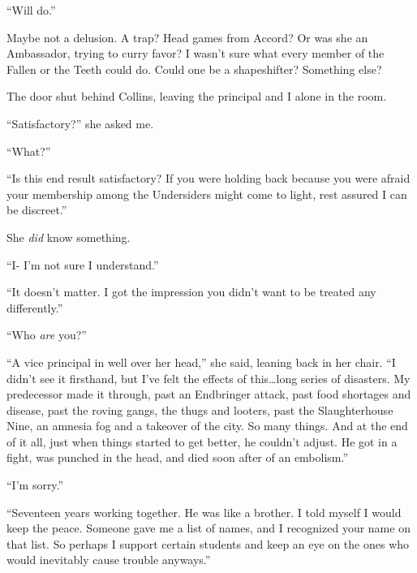 ``Will do.''



Maybe not a delusion.  A trap?  Head games from Accord?  Or was she an Ambassador, trying to curry favor?  I wasn't sure what every member of the Fallen or the Teeth could do.  Could one be a shapeshifter?  Something else?



The door shut behind Collins, leaving the principal and I alone in the room.



``Satisfactory?'' she asked me.



``What?''



``Is this end result satisfactory?  If you were holding back because you were afraid your membership among the Undersiders might come to light, rest assured I can be discreet.''



She \emph{did} know something.



``I- I'm not sure I understand.''



``It doesn't matter.  I got the impression you didn't want to be treated any differently.''



``Who \emph{are} you?''



``A vice principal in well over her head,'' she said, leaning back in her chair.  ``I didn't see it firsthand, but I've felt the effects of this\ldots long series of disasters.  My predecessor made it through, past an Endbringer attack, past food shortages and disease, past the roving gangs, the thugs and looters, past the Slaughterhouse Nine, an amnesia fog and a takeover of the city.  So many things.  And at the end of it all, just when things started to get better, he couldn't adjust.  He got in a fight, was punched in the head, and died soon after of an embolism.''



``I'm sorry.''



``Seventeen years working together.  He was like a brother.  I told myself I would keep the peace.  Someone gave me a list of names, and I recognized your name on that list.  So perhaps I support certain students and keep an eye on the ones who would inevitably cause trouble anyways.''



